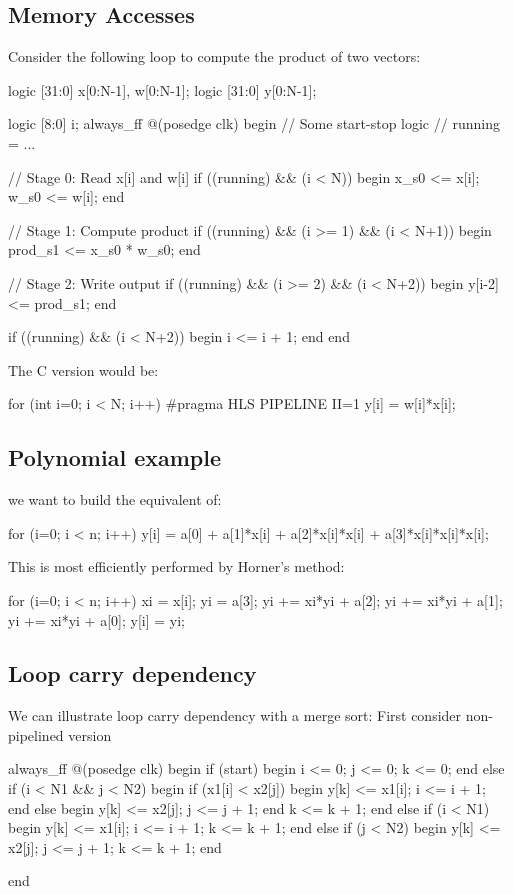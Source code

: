 \documentclass[11pt]{article}
\begin{document}
\pagebreak
\subsection*{Memory Accesses}

Consider the following loop to compute the product of two vectors:
\begin{systemverilogcode}
logic [31:0] x[0:N-1], w[0:N-1];
logic [31:0] y[0:N-1];

logic [8:0] i;
always_ff @(posedge clk) begin
  // Some start-stop logic
  // running = ...

  // Stage 0:  Read x[i] and w[i]
  if ((running) && (i < N)) begin
    x_s0 <= x[i];
    w_s0 <= w[i];
  end

  // Stage 1:  Compute product
  if ((running) && (i >= 1) && (i < N+1)) begin
    prod_s1 <= x_s0 * w_s0;
  end

  // Stage 2:  Write output
  if ((running) && (i >= 2) && (i < N+2)) begin
    y[i-2] <= prod_s1;
  end

  if ((running) && (i < N+2)) begin
    i <= i + 1;
  end 
end
\end{systemverilogcode}

The C version would be:

\begin{ccode}
for (int i=0; i < N; i++) {
#pragma HLS PIPELINE II=1
  y[i] = w[i]*x[i];
}
\end{ccode}

\subsection{Polynomial example}

we want to build the equivalent of:
\begin{ccode}
for (i=0; i < n; i++) {
  y[i] = a[0] + a[1]*x[i] 
      + a[2]*x[i]*x[i] + a[3]*x[i]*x[i]*x[i];
}
\end{ccode}

This is most efficiently performed by Horner's method:
\begin{ccode}
for (i=0; i < n; i++) {
  xi = x[i];
  yi = a[3];
  yi += xi*yi + a[2];
  yi += xi*yi + a[1];
  yi += xi*yi + a[0];
  y[i] = yi;
}
\end{ccode}

\subsection*{Loop carry dependency}

We can illustrate loop carry dependency with a merge sort:
First consider non-pipelined version
\begin{systemverilogcode}
always_ff @(posedge clk) begin
  if (start) begin
    i <= 0;
    j <= 0;
    k <= 0;
  end else if (i < N1 && j < N2) begin
    if (x1[i] < x2[j]) begin
      y[k] <= x1[i];
      i <= i + 1;
    end else begin
      y[k] <= x2[j];
      j <= j + 1;
    end
    k <= k + 1;
  end else if (i < N1) begin
    y[k] <= x1[i];
    i <= i + 1;
    k <= k + 1;
  end else if (j < N2) begin
    y[k] <= x2[j];
    j <= j + 1;
    k <= k + 1;
  end
 
end

\end{systemverilogcode}
\end{document}
